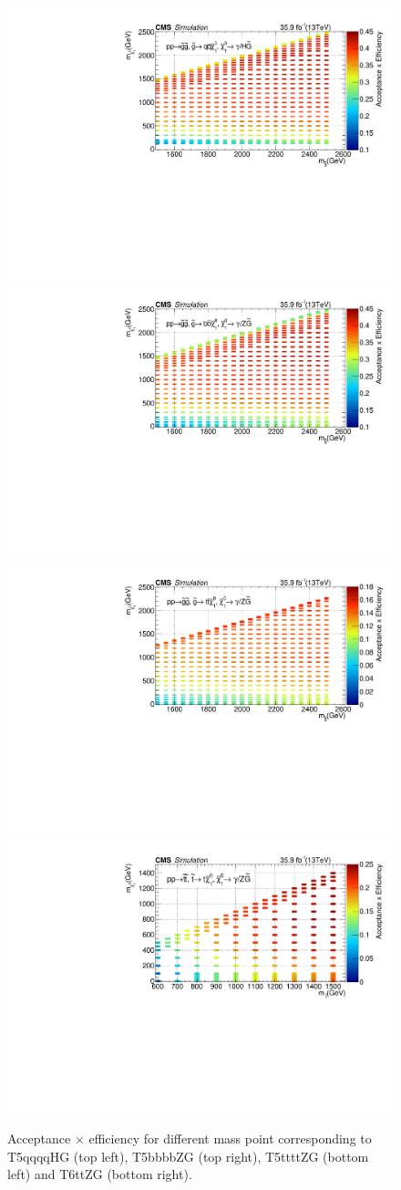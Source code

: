 \begin{figure}[h!]
\centering
\includegraphics[width=0.46\linewidth]{../Figures/Chap3/optimization/T5qqqqHg_AccEff.pdf} \xspace
\includegraphics[width=0.46\linewidth]{../Figures/Chap3/optimization/T5bbbbZg_AccEff.pdf}\\
\includegraphics[width=0.46\linewidth]{../Figures/Chap3/optimization/T5ttttZg_AccEff.pdf} \xspace
\includegraphics[width=0.46\linewidth]{../Figures/Chap3/optimization/T6ttZg_AccEff.pdf}
\caption{Acceptance $\times$ efficiency for different mass point corresponding to T5qqqqHG (top left), T5bbbbZG (top right), T5ttttZG (bottom left) and T6ttZG (bottom right).}
\label{fig:sigEff}
\end{figure}